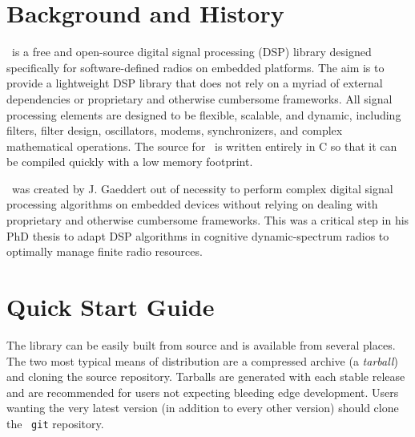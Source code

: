 %
%

\newpage
\section{Background and History}

\liquid\ is a free and open-source digital signal processing (DSP) library
designed specifically for software-defined radios on embedded platforms.
The aim is to provide a lightweight DSP library that does not rely on a myriad
of external dependencies or proprietary and otherwise cumbersome frameworks.
%
All signal processing elements are designed to be flexible, scalable, and
dynamic, including filters, filter design, oscillators, modems, synchronizers,
and complex mathematical operations.
The source for \liquid\ is written entirely in C so that it can be
compiled quickly with a low memory footprint.

\liquid\ was created by J. Gaeddert out of necessity to perform complex
digital signal processing algorithms on embedded devices
without relying on dealing
with proprietary and otherwise cumbersome frameworks.
This was a critical step in his PhD thesis to adapt DSP algorithms in
cognitive dynamic-spectrum radios to optimally manage finite radio resources.


%
%

\section{Quick Start Guide}
\label{section:quickstart}
The library can be easily built from source and is available from
several places.
The two most typical means of distribution are a compressed archive
(a {\em tarball}) and cloning the source repository.
Tarballs are generated with each stable release and are recommended for
users not expecting bleeding edge development.
Users wanting the very latest version (in addition to every other
version) should clone the \liquid\ {\tt git} repository.

